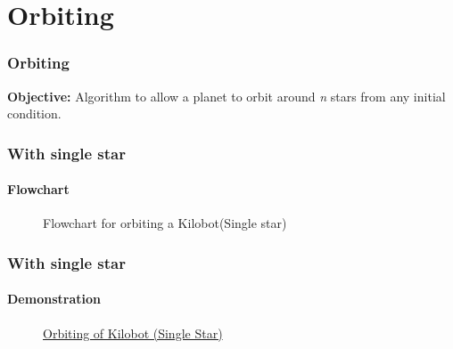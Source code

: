 \section{Orbiting}
\begin{frame}
	\frametitle{Orbiting}
		\textbf{Objective:} Algorithm to allow a planet to orbit around \textit{n} stars from any initial condition.
		\begin{itemize}
	\end{itemize}
\end{frame}

\begin{frame}
\frametitle{With single star}
\framesubtitle{Flowchart}
\begin{figure}[H]
	\centering
	\caption{Flowchart for orbiting a Kilobot(Single star)}
	\label{fig:Flowchart_for_orbiting_a_Kilobot(Single_star)}
\end{figure}
\end{frame}

\begin{frame}
\frametitle{With single star}
\framesubtitle{Demonstration}
\begin{figure}[H]
	\centering
	\caption{\href{https://drive.google.com/file/d/1fLfsFgo0ob07vIyrgzMQ1_RKYdbQMO9P/view}{Orbiting of Kilobot (Single Star)}}
	\label{fig:planet-star-demo}
\end{figure}
\end{frame}

